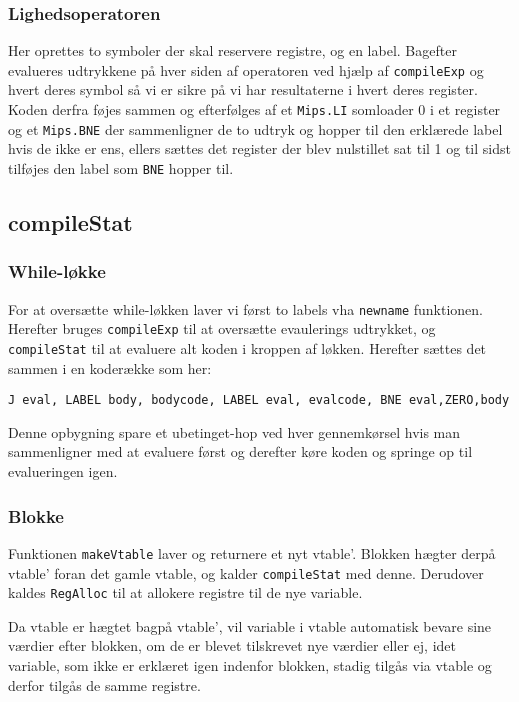 \documentclass[a4paper, 10pt]{article}
\begin{document}
\subsubsection{Lighedsoperatoren}
Her oprettes to symboler der skal reservere registre, og en label. Bagefter evalueres udtrykkene på hver siden af operatoren ved hjælp af \texttt{compileExp} og hvert deres symbol så vi er sikre på vi har resultaterne i hvert deres register. Koden derfra føjes sammen og efterfølges af et \texttt{Mips.LI} somloader 0 i et register og et \texttt{Mips.BNE} der sammenligner de to udtryk og hopper til den erklærede label hvis de ikke er ens, ellers sættes det register der blev nulstillet sat til 1 og til sidst tilføjes den label som \texttt{BNE} hopper til.

\subsection{compileStat}
\subsubsection{While-løkke}
For at oversætte while-løkken laver vi først to labels vha \texttt{newname} funktionen.
Herefter bruges \texttt{compileExp} til at oversætte evaulerings udtrykket, og \texttt{compileStat} 
til at evaluere alt koden i kroppen af løkken. Herefter sættes det sammen i en koderække som her:
\begin{center}
\texttt{J eval, LABEL body, bodycode, LABEL eval, evalcode, BNE eval,ZERO,body}
\end{center}

Denne opbygning spare et ubetinget-hop ved hver gennemkørsel hvis man sammenligner med at evaluere 
først og derefter køre koden og springe op til evalueringen igen.

\subsubsection{Blokke}
Funktionen \texttt{makeVtable} laver og returnere et nyt vtable'. Blokken
hægter derpå vtable' foran det gamle vtable, og kalder \texttt{compileStat} med
denne. Derudover kaldes \texttt{RegAlloc} til at allokere registre til de nye
variable.

Da vtable er hægtet bagpå vtable', vil variable i vtable automatisk bevare
sine værdier efter blokken, om de er blevet tilskrevet nye værdier eller ej,
idet variable, som ikke er erklæret igen indenfor blokken, stadig tilgås via
vtable og derfor tilgås de samme registre.
\end{document}
